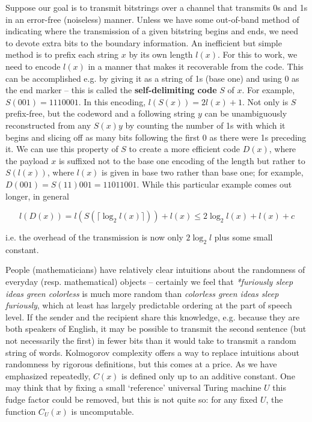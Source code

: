\medskip\noindent Suppose our goal is to transmit bitstrings over a channel
that transmits 0s and 1s in an error-free (noiseless) manner. Unless we have
some out-of-band method of indicating where the transmission of a given
bitstring begins and ends, we need to devote extra bits to the boundary
information. An inefficient but simple method is to prefix each string $x$ by
its own length $l(x)$. For this to work, we need to encode $l(x)$ in a manner
that makes it recoverable from the code. This can be accomplished e.g. by
giving it as a string of 1s (base one) and using $0$ as the end marker -- this
is called the {\bf self-delimiting code} $S$ of
$x$. For example, $S(001)=1110001$. In this
encoding, $l(S(x))=2l(x)+1$. Not only is $S$ prefix-free, but the codeword and
a following string $y$ can be unambiguously reconstructed from any $S(x)y$ by
counting the number of 1s with which it begins and slicing off as many bits
following the first 0 as there were 1s preceding it. We can use this property
of $S$ to create a more efficient code $D(x)$, where the payload $x$ is
suffixed not to the base one encoding of the length but rather to $S(l(x))$,
where $l(x)$ is given in base two rather than base one; for example,
$D(001)=S(11)001=11011001$. While this particular example comes out longer, in
general

\begin{equation}
l(D(x))=l(S( \lceil\log_2 l(x)\rceil ))+l(x) \leq 2\log_2 l(x) +l(x) +c
\end{equation}

\smallskip\noindent i.e. the overhead of the transmission is now only $2\log_2
l$ plus some small constant.

People (mathematicians) have relatively clear intuitions about the randomness
of everyday (resp. mathematical) objects -- certainly we feel that {\it
  *furiously sleep ideas green colorless} is much more random than {\it
  colorless green ideas sleep furiously}, which at least has largely
predictable ordering at the part of speech level. If the sender and the
recipient share this knowledge, e.g. because they are both speakers of
English, it may be possible to transmit the second sentence (but not
necessarily the first) in fewer bits than it would take to transmit a random
string of words. Kolmogorov complexity offers a way to replace intuitions
about randomness by rigorous definitions, but this comes at a price. As we
have emphasized repeatedly, $C(x)$ is defined only up to an additive
constant. One may think that by fixing a small `reference' universal Turing
machine $U$ this fudge factor could be removed, but this is not quite so: for
any fixed $U$, the function $C_U(x)$ is uncomputable.


